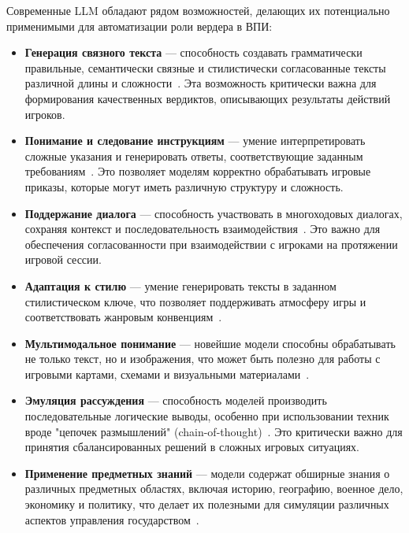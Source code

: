 Современные LLM обладают рядом возможностей, делающих их потенциально применимыми для автоматизации роли вердера в ВПИ:

\begin{itemize}
    \item \textbf{Генерация связного текста} — способность создавать грамматически правильные, семантически связные и стилистически согласованные тексты различной длины и сложности~\cite{brown2020language}. Эта возможность критически важна для формирования качественных вердиктов, описывающих результаты действий игроков.

    \item \textbf{Понимание и следование инструкциям} — умение интерпретировать сложные указания и генерировать ответы, соответствующие заданным требованиям~\cite{wei2022finetuned}. Это позволяет моделям корректно обрабатывать игровые приказы, которые могут иметь различную структуру и сложность.

    \item \textbf{Поддержание диалога} — способность участвовать в многоходовых диалогах, сохраняя контекст и последовательность взаимодействия~\cite{thoppilan2022lamda}. Это важно для обеспечения согласованности при взаимодействии с игроками на протяжении игровой сессии.

    \item \textbf{Адаптация к стилю} — умение генерировать тексты в заданном стилистическом ключе, что позволяет поддерживать атмосферу игры и соответствовать жанровым конвенциям~\cite{keskar2019ctrl}.

    \item \textbf{Мультимодальное понимание} — новейшие модели способны обрабатывать не только текст, но и изображения, что может быть полезно для работы с игровыми картами, схемами и визуальными материалами~\cite{alayrac2022flamingo}.

    \item \textbf{Эмуляция рассуждения} — способность моделей производить последовательные логические выводы, особенно при использовании техник вроде "{}цепочек размышлений"{} (chain-of-thought)~\cite{wei2022chain}. Это критически важно для принятия сбалансированных решений в сложных игровых ситуациях.

    \item \textbf{Применение предметных знаний} — модели содержат обширные знания о различных предметных областях, включая историю, географию, военное дело, экономику и политику, что делает их полезными для симуляции различных аспектов управления государством~\cite{brown2020language}.
\end{itemize}

